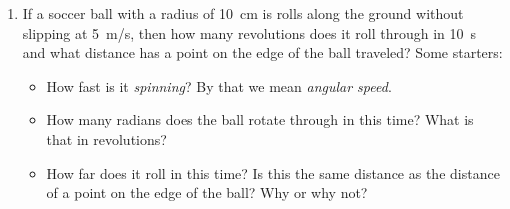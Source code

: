 \begin{enumerate}

%

\item If a soccer ball with a radius of \SI{10}{\centi\meter} is rolls along the ground without slipping at \SI{5}{m/s}, then how many revolutions does it roll through in \SI{10}{\second} and what distance has a point on the edge of the ball traveled?
Some starters:
\begin{itemize}
	\item How fast is it \emph{spinning}? By that we mean \emph{angular speed}.
	\item How many radians does the ball rotate through in this time? What is that in revolutions?
	\item How far does it roll in this time? Is this the same distance as the distance of a point on the edge of the ball? Why or why not?
\end{itemize}
\hugeskip


\end{enumerate}

